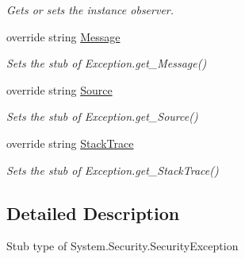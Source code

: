 \begin{DoxyCompactItemize}
\begin{DoxyCompactList}\small\item\em Gets or sets the instance observer.\end{DoxyCompactList}\item 
override string \hyperlink{class_system_1_1_security_1_1_fakes_1_1_stub_security_exception_a132c80f0ee6fbacc1adecccd78373aa7}{Message}
\begin{DoxyCompactList}\small\item\em Sets the stub of Exception.\-get\-\_\-\-Message()\end{DoxyCompactList}\item 
override string \hyperlink{class_system_1_1_security_1_1_fakes_1_1_stub_security_exception_a30de26bb9d11a5c5863ddbfb4ff2c597}{Source}
\begin{DoxyCompactList}\small\item\em Sets the stub of Exception.\-get\-\_\-\-Source()\end{DoxyCompactList}\item 
override string \hyperlink{class_system_1_1_security_1_1_fakes_1_1_stub_security_exception_a35190467928a6a0d4c89fb51708a0569}{Stack\-Trace}
\begin{DoxyCompactList}\small\item\em Sets the stub of Exception.\-get\-\_\-\-Stack\-Trace()\end{DoxyCompactList}\end{DoxyCompactItemize}


\subsection{Detailed Description}
Stub type of System.\-Security.\-Security\-Exception



